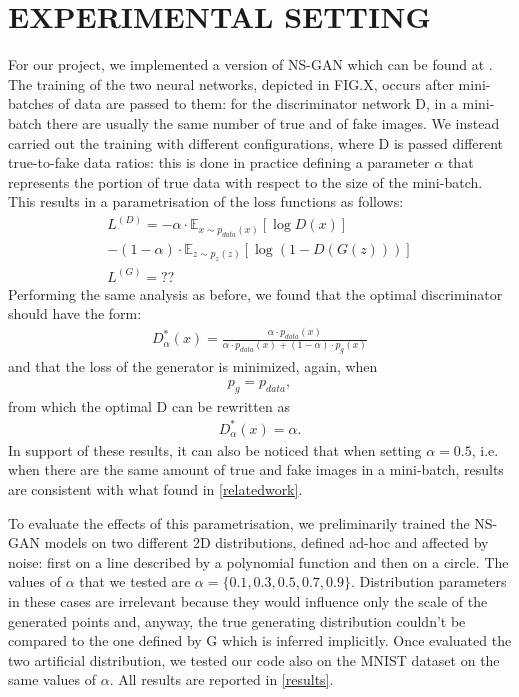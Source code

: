 \section{EXPERIMENTAL SETTING} \label{expsetting}

For our project, we implemented a version of NS-GAN which can be found at \cite{bibid}. The training of the two neural networks, depicted in FIG.X, occurs after mini-batches of data are passed to them: for the discriminator network D, in a mini-batch there are usually the same number of true and of fake images. We instead carried out the training with different configurations, where D is passed different true-to-fake data ratios: this is done in practice defining a parameter $\alpha$ that represents the portion of true data with respect to the size of the mini-batch. This results in a parametrisation of the loss functions as follows:
\begin{align*}
	L^{(D)}=-\alpha\cdot\mathbb{E}_{x \sim p_{data}(x)}[\log D(x)] \\
	- (1-\alpha)\cdot\mathbb{E}_{z \sim p_{z}(z)}[\log (1-D(G(z)))]\\
	L^{(G)}=??
\end{align*}
Performing the same analysis as before, we found that the optimal discriminator should have the form:
\begin{align*}
	D_{\alpha}^*(x) = \frac{\alpha \cdot p_{data}(x)}{\alpha \cdot p_{data}(x) + (1-\alpha)\cdot p_g(x)}
\end{align*}
and that the loss of the generator is minimized, again, when
\begin{align*}
	p_g = p_{data},
\end{align*}
from which the optimal D can be rewritten as
\begin{align*}
	D_{\alpha}^*(x) = \alpha.
\end{align*}
In support of these results, it can also be noticed that when setting $\alpha = 0.5$, i.e. when there are the same amount of true and fake images in a mini-batch, results are consistent with what found in \ref{relatedwork}.

To evaluate the effects of this parametrisation, we preliminarily trained the NS-GAN models on two different 2D distributions, defined ad-hoc and affected by noise: first on a line described by a polynomial function and then on a circle.
The values of $\alpha$ that we tested are $\alpha = \{0.1,0.3,0.5,0.7,0.9\}$.
Distribution parameters in these cases are irrelevant because they would influence only the scale of the generated points and, anyway, the true generating distribution couldn't be compared to the one defined by G which is inferred implicitly.
Once evaluated the two artificial distribution, we tested our code also on the MNIST dataset on the same values of $\alpha$.
All results are reported in \ref{results}.